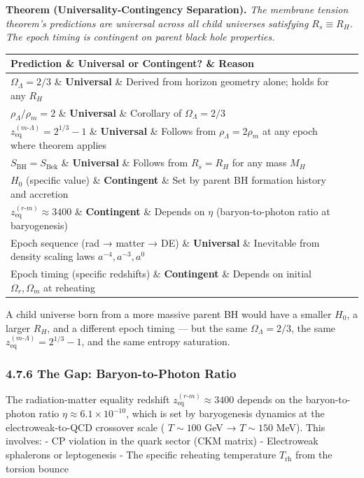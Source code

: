 \documentclass[11pt,a4paper]{article}
\theoremstyle{definition}\newtheorem{definition}{Definition}
\theoremstyle{remark}\newtheorem{remark}{Remark}
\begin{document}
\textbf{Theorem (Universality-Contingency Separation).} \textit{The membrane tension theorem's predictions are universal across all child universes satisfying $R_s \equiv R_H$. The epoch timing is contingent on parent black hole properties.}

\begin{longtable}{lll}
\hline
Prediction \& Universal or Contingent? \& Reason \\
\hline
$\Omega_\Lambda = 2/3$ \& \textbf{Universal} \& Derived from horizon geometry alone; holds for any $R_H$ \\
$\rho_\Lambda / \rho_m = 2$ \& \textbf{Universal} \& Corollary of $\Omega_\Lambda = 2/3$ \\
$z_{\text{eq}}^{(m\text{-}\Lambda)} = 2^{1/3} - 1$ \& \textbf{Universal} \& Follows from $\rho_\Lambda = 2\rho_m$ at any epoch where theorem applies \\
$S_{\text{BH}} = S_{\text{Bek}}$ \& \textbf{Universal} \& Follows from $R_s = R_H$ for any mass $M_H$ \\
$H_0$ (specific value) \& \textbf{Contingent} \& Set by parent BH formation history and accretion \\
$z_{\text{eq}}^{(r\text{-}m)} \approx 3400$ \& \textbf{Contingent} \& Depends on $\eta$ (baryon-to-photon ratio at baryogenesis) \\
Epoch sequence (rad → matter → DE) \& \textbf{Universal} \& Inevitable from density scaling laws $a^{-4}, a^{-3}, a^{0}$ \\
Epoch timing (specific redshifts) \& \textbf{Contingent} \& Depends on initial $\Omega_r, \Omega_m$ at reheating \\
\hline
\end{longtable}
A child universe born from a more massive parent BH would have a smaller $H_0$, a larger $R_H$, and a different epoch timing — but the same $\Omega_\Lambda = 2/3$, the same $z_{\text{eq}}^{(m\text{-}\Lambda)} = 2^{1/3} - 1$, and the same entropy saturation.
\subsubsection{4.7.6 The Gap: Baryon-to-Photon Ratio}

The radiation-matter equality redshift $z_{\text{eq}}^{(r\text{-}m)} \approx 3400$ depends on the baryon-to-photon ratio $\eta \approx 6.1 \times 10^{-10}$, which is set by baryogenesis dynamics at the electroweak-to-QCD crossover scale ( $T \sim 100$ GeV → $T \sim 150$ MeV). This involves:
- CP violation in the quark sector (CKM matrix)
- Electroweak sphalerons or leptogenesis
- The specific reheating temperature $T_{\text{rh}}$ from the torsion bounce
\end{document}
